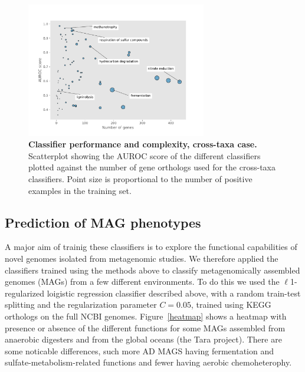 \documentclass[10pt,letterpaper]{article}
\begin{document}
\begin{figure}
\includegraphics[width=0.7\textwidth]{fig6}
\caption{{\bf Classifier performance and complexity, cross-taxa case.}
Scatterplot showing the AUROC score of the different classifiers plotted against the number of gene orthologs used for the cross-taxa classifiers. Point size is proportional to the number of positive examples in the training set.}
\label{fig6}
\end{figure}

\subsection*{Prediction of MAG phenotypes}
A major aim of trainig these classifiers is to explore the functional capabilities of novel genomes isolated from metagenomic studies. We therefore applied the classifiers trained using the methods above to classify metagenomically assembled genomes (MAGs) from a few different environments. To do this we used the $\ell$1-regularized loigistic regression classifier described above, with a random train-test splitting and the regularization parameter $C=0.05$, trained using KEGG orthologs on the full NCBI genomes. Figure~\ref{heatmap} shows a heatmap with presence or absence of the different functions for some MAGs assembled from anaerobic digesters and from the global oceans (the Tara project). There are some noticable differences, such more AD MAGS having fermentation and sulfate-metabolism-related functions and fewer having aerobic chemoheterophy. 
\end{document}
